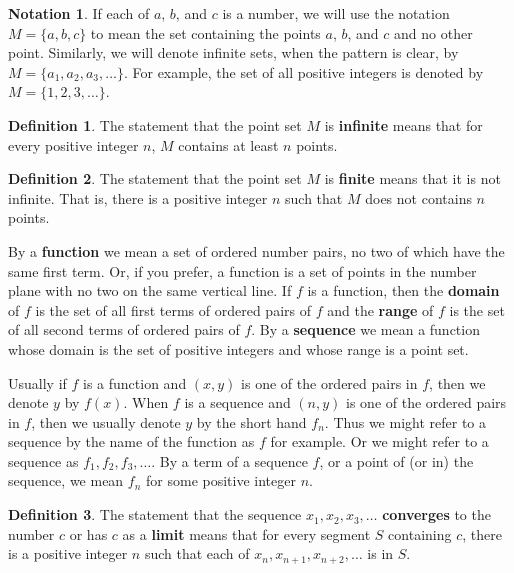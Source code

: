 \documentclass{article}
\theoremstyle{definition}
\newtheorem{definition}{Definition}
\newtheorem{notation}{Notation}
\begin{document}
\begin{notation}
If each of $a$, $b$, and $c$ is a number, we will use the notation $M = \{a, b, c\}$ to mean the set containing the points $a$, $b$, and $c$ and no other point. Similarly, we will denote infinite sets, when the pattern is clear, by $M = \{a_1, a_2, a_3, \dots\}$. For example, the set of all positive integers is denoted by $M = \{1, 2, 3, \dots\}$.
\end{notation}

\begin{definition}
The statement that the point set $M$ is \textbf{infinite} means that for every positive integer $n$, $M$ contains at least $n$ points.
\end{definition}

\begin{definition}
The statement that the point set $M$ is \textbf{finite} means that it is not infinite. That is, there is a positive integer $n$ such that $M$ does not contains $n$ points.
\end{definition}

By a \textbf{function} we mean a set of ordered number pairs, no two of which have the same first term. Or, if you prefer, a function is a set of points in the number plane with no two on the same vertical line. If $f$ is a function, then the \textbf{domain} of $f$ is the set of all first terms of ordered pairs of $f$ and the \textbf{range} of $f$ is the set of all second terms of ordered pairs of $f$. By a \textbf{sequence} we mean a function whose domain is the set of positive integers and whose range is a point set.

Usually if $f$ is a function and $(x, y)$ is one of the ordered pairs in $f$, then we denote $y$ by $f(x)$. When $f$ is a sequence and $(n, y)$ is one of the ordered pairs in $f$, then we usually denote $y$ by the short hand $f_n$. Thus we might refer to a sequence by the name of the function as $f$ for example. Or we might refer to a sequence as $f_1, f_2, f_3, \dots$. By a term of a sequence $f$, or a point of (or in) the sequence, we mean $f_n$ for some positive integer $n$.

\begin{definition}
The statement that the sequence $x_1, x_2, x_3, \dots$ \textbf{converges} to the number $c$ or has $c$ as a \textbf{limit} means that for every segment $S$ containing $c$, there is a positive integer $n$ such that each of $x_n, x_{n+1}, x_{n+2}, \dots$ is in $S$.
\end{definition}
\end{document}
